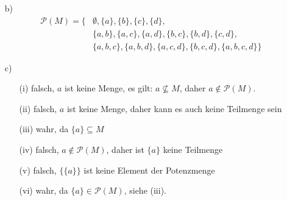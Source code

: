 \documentclass[a4paper]{scrartcl}
\begin{document}
\begin{enumerate}
\begin{enumerate}

            \item[b)]
                \begin{align}
                    \nonumber \mathcal{P}(M) = \Big\{ & \emptyset, \{a\}, \{b\}, \{c\}, \{d\},\\
                    \nonumber & \{a,b\}, \{a,c\}, \{a,d\}, \{b,c\}, \{b,d\}, \{c,d\},\\
                              & \{a,b,c\}, \{a,b,d\}, \{a,c,d\}, \{b,c,d\}, \{a,b,c,d\} \Big\}
                \end{align}

            \item[c)]
                \begin{enumerate}
                    \item[(i)]
                        falsch, $a$ ist keine Menge, es gilt: $a \not\subseteq M$, daher $a \notin \mathcal{P}(M)$.
                    \item[(ii)]
                        falsch, $a$ ist keine Menge, daher kann es auch keine Teilmenge sein
                    \item[(iii)]
                        wahr, da $\{a\} \subseteq M$
                    \item[(iv)]
                        falsch, $a \notin \mathcal{P}(M)$, daher ist $\{a\}$ keine Teilmenge
                    \item[(v)]
                        falsch, $\{\{a\}\}$ ist keine Element der Potenzmenge
                    \item[(vi)]
                        wahr, da $\{a\} \in \mathcal{P}(M)$, siehe (iii).
                \end{enumerate}


        \end{enumerate}
\end{enumerate}
\end{document}
